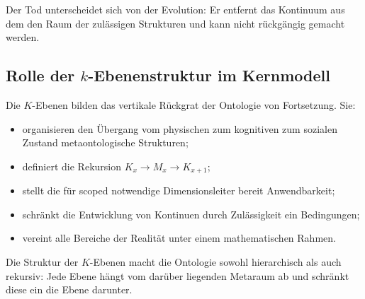 Der Tod unterscheidet sich von der Evolution: Er entfernt das Kontinuum aus dem
den Raum der zulässigen Strukturen und kann nicht rückgängig gemacht werden.


\subsection{Rolle der \texorpdfstring{$k$}{k}-Ebenenstruktur im Kernmodell}

Die $K$-Ebenen bilden das vertikale Rückgrat der Ontologie von
Fortsetzung.
Sie:
\begin{itemize}
    \item organisieren den Übergang vom physischen zum kognitiven zum sozialen Zustand
          metaontologische Strukturen;
    \item definiert die Rekursion $K_x \to M_x \to K_{x+1}$;
    \item stellt die für scoped notwendige Dimensionsleiter bereit
          Anwendbarkeit;
    \item schränkt die Entwicklung von Kontinuen durch Zulässigkeit ein
          Bedingungen;
    \item vereint alle Bereiche der Realität unter einem mathematischen Rahmen.
\end{itemize}

Die Struktur der $K$-Ebenen macht die Ontologie sowohl hierarchisch als auch
rekursiv: Jede Ebene hängt vom darüber liegenden Metaraum ab und schränkt diese ein
die Ebene darunter.
